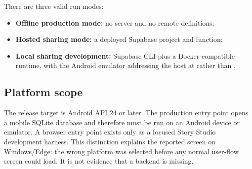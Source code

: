 There are three valid run modes:
\begin{itemize}
  \item \textbf{Offline production mode:} no server and no remote definitions;
  \item \textbf{Hosted sharing mode:} a deployed Supabase project and function;
  \item \textbf{Local sharing development:} Supabase CLI plus a Docker-compatible
        runtime, with the Android emulator addressing the host at
         rather than .
\end{itemize}

\subsection{Platform scope}
The release target is Android API 24 or later. The production entry point opens a
mobile SQLite database and therefore must be run on an Android device or
emulator. A browser entry point exists only as a focused Story Studio development
harness. This distinction explains the reported  screen on Windows/Edge: the wrong platform was selected before any
normal user-flow screen could load. It is not evidence that a backend is missing.
